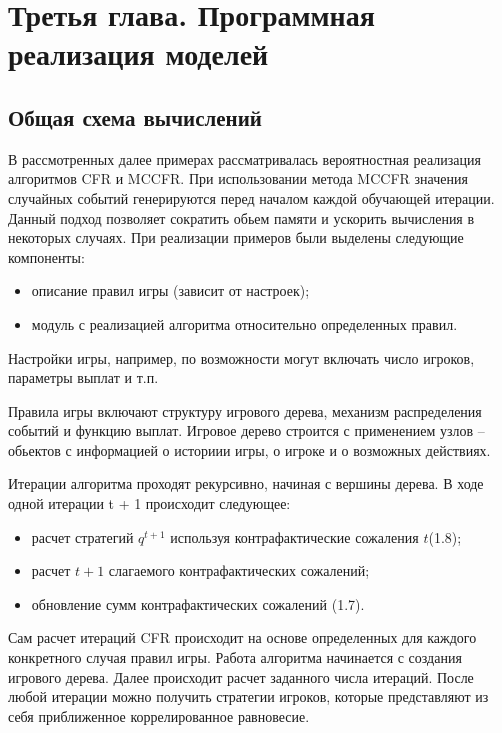 \chapter{Третья глава. Программная реализация моделей}
\label{cha:ch_3}
\section{Общая схема вычислений}

\par
В рассмотренных далее примерах рассматривалась вероятностная реализация алгоритмов CFR и MCCFR. При использовании метода MCCFR значения случайных событий генерируются перед началом каждой обучающей итерации. Данный подход позволяет сократить обьем памяти и ускорить вычисления в некоторых случаях\cite{MCCFR}.
При реализации примеров были выделены следующие компоненты:
\begin{itemize}
	\item описание правил игры (зависит от настроек);
	\item модуль с реализацией алгоритма относительно определенных правил.
\end{itemize}
\par
Настройки игры, например, по возможности могут включать число игроков, параметры выплат и т.п.
\par
Правила игры включают структуру игрового дерева, механизм распределения событий и функцию выплат. Игровое дерево строится с применением узлов -- обьектов с информацией о историии игры, о игроке и о возможных действиях.
\par
Итерации алгоритма проходят рекурсивно, начиная с вершины дерева. В ходе одной итерации t + 1 происходит следующее:
\begin{itemize}
\item расчет стратегий $q^{t + 1}$ используя контрафактические сожаления $t$(1.8);
\item расчет $t + 1$ слагаемого контрафактических сожалений;
\item обновление сумм контрафактических сожалений (1.7).
\end{itemize}
\par
Сам расчет итераций CFR происходит на основе определенных для каждого конкретного случая правил игры. Работа алгоритма начинается с создания игрового дерева. Далее происходит расчет заданного числа итераций. После любой итерации можно получить стратегии игроков, которые представляют из себя приближенное коррелированное равновесие.

